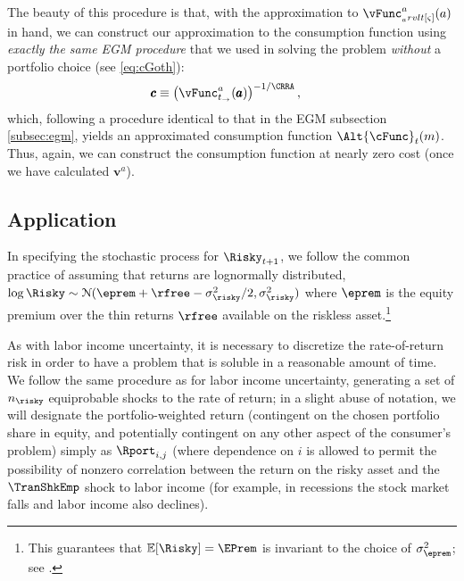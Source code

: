 \documentclass[titlepage, headings=optiontotocandhead]{Resources/texmf-local/tex/latex/econtex}
\begin{document}
The beauty of this procedure is that, with the approximation to $\vFunc_{_arvlt[\varsigma]}^{a}(a)$ in hand, we can construct our approximation to the consumption function using \emph{exactly the same EGM procedure} that we used in solving the problem \emph{without} a portfolio choice (see \eqref{eq:cGoth}):
\begin{equation}\begin{gathered}\begin{aligned}
      \pmb{c}  & \equiv  \left(\vFunc^{a}_{t_\rightarrow}(\pmb{a})\right)^{-1/\CRRA} \label{eq:cVecPort},
    \end{aligned}\end{gathered}\end{equation}
which, following a procedure identical to that in the EGM subsection \ref{subsec:egm}, yields an approximated consumption function $\Alt{\cFunc}_{t}({m})$.  Thus, again, we can construct the consumption function at nearly zero cost (once we have calculated $\pmb{v}^{a}$).

\subsection{Application}\label{subsec:MCApplication}

In specifying the stochastic process for $\Risky_{t+1}$, we follow the common practice of assuming that returns are lognormally distributed, $\log \Risky \sim \mathcal{N}(\eprem+\rfree-\sigma^{2}_{\risky}/2,\sigma^{2}_{\risky})$ where $\eprem$ is the equity premium over the thin returns $\rfree$ available on the riskless asset.\footnote{This guarantees that $\Ex[\Risky] = \EPrem$ is invariant to the choice of $\sigma^{2}_{\eprem}$; see .}

As with labor income uncertainty, it is necessary to discretize the rate-of-return risk in order to have a problem that is soluble in a reasonable amount of time.  We follow the same procedure as for labor income uncertainty, generating a set of $n_{\risky}$ equiprobable shocks to the rate of return; in a slight abuse of notation, we will designate the portfolio-weighted return (contingent on the chosen portfolio share in equity, and potentially contingent on any other aspect of the consumer's problem) simply as $\Rport_{i,j}$ (where dependence on $i$ is allowed to permit the possibility of nonzero correlation between the return on the risky asset and the $\TranShkEmp$ shock to labor income (for example, in recessions the stock market falls and labor income also declines).
\end{document}
